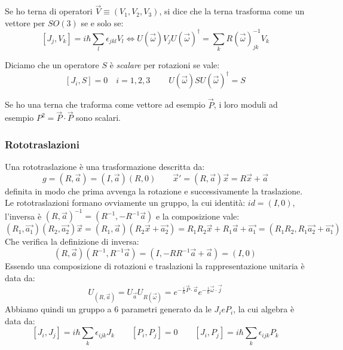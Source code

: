 \begin{definition}
    Se ho terna di operatori \(\vec{V}\equiv (V_1,V_2,V_3)\), si dice che la terna trasforma come un vettore per \(SO(3)\) se e solo se:
    \begin{equation}
        \left[ J_j, V_k  \right]= i\hbar \sum_{l}\epsilon_{jkl}V_l \iff U(\vec{\omega}) V_j U (\vec{\omega})^\dagger = \sum_{k} R(\vec{\omega})^{-1}_{jk}V_k
    \end{equation}
\end{definition}
\begin{definition}
    Diciamo che un operatore \(S\) è \textit{scalare} per rotazioni se vale:
    \begin{equation}
        \left[ J_i,S \right]=0 \quad i = 1,2,3 \qquad \ U(\vec{\omega})S U(\vec{\omega})^{\dagger} = S
    \end{equation}
\end{definition}
\begin{example}
    Se ho una terna che traforma come vettore ad esempio \(\vec{P}\), i loro moduli ad esempio \(P^2 = \vec{P}\cdot \vec{P}\) sono scalari.
\end{example}



\subsubsection{Rototraslazioni}

Una rototraslazione è una trasformazione descritta da:
\begin{equation}
    g = (R, \vec{a})= (I, \vec{a})(R,0) \qquad \vec{x}'= (R, \vec{a})\vec{x}= R\vec{x}+ \vec{a}
\end{equation}
definita in modo che prima avvenga la rotazione e successivamente la traslazione.\\
Le rototraslazioni formano ovviamente un gruppo, la cui identità: \(id = (I,0)\), l'inversa è \((R,\vec{a})^{-1}= (R^{-1}, -R^{-1}\vec{a})\) e la composizione vale:
\[
(R_1,\vec{a_1})(R_2, \vec{a_2})\vec{x}= (R _1, \vec{a})(R_2\vec{x}+\vec{a_2})= R_1R_2\vec{x}+ R_1\vec{a}+ \vec{a_1}= (R_1R_2, R_1\vec{a_2}+\vec{a_1})
\]
Che verifica la definizione di inversa:
\[
    (R, \vec{a})(R^{-1}, R^{-1}\vec{a}) = (I, - RR^{-1}\vec{a}+\vec{a})= (I,0)
\]
Essendo una composizione di rotazioni e traslazioni la rappresentazione unitaria è data da:
\[
    U_{(R, \vec{a})}= U_{\vec{a}}U_{R(\vec{\omega})}= e^{-\frac{i}{\hbar}\vec{P}\cdot\vec{a}}e^{-\frac{i}{\hbar}\vec{\omega}\cdot\vec{j}}
\]
Abbiamo quindi un gruppo a 6 parametri generato da le \(J_i e P_i\), la cui algebra è data da:
\[
    \left[ J_i, J_j  \right]= i\hbar \sum_k\epsilon_{ijk}J_k \qquad 
    \left[ P_i, P_j \right] =0 \qquad \left[ J_i, P_j\right] = i\hbar \sum_k    \epsilon_{ijk}P_k
\]




